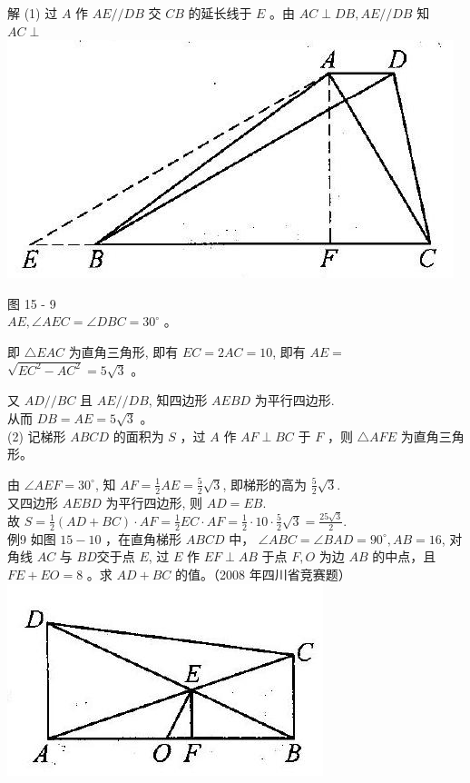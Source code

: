 \documentclass[10pt]{article}
\begin{document}
解 (1) 过 $A$ 作 $A E / / D B$ 交 $C B$ 的延长线于 $E$ 。由 $A C \perp D B, A E / / D B$ 知 $A C \perp$\\
\includegraphics[max width=\textwidth, center]{2024_10_30_2c8f45efd4a519b08e1ag-141(2)}

图 15 - 9\\
$A E, \angle A E C=\angle D B C=30^{\circ}$ 。

即 $\triangle E A C$ 为直角三角形, 即有 $E C=2 A C=10$, 即有 $A E=$ $\sqrt{E C^{2}-A C^{2}}=5 \sqrt{3}$ 。

又 $A D / / B C$ 且 $A E / / D B$, 知四边形 $A E B D$ 为平行四边形.\\
从而 $D B=A E=5 \sqrt{3}$ 。\\
(2) 记梯形 $A B C D$ 的面积为 $S$ ，过 $A$ 作 $A F \perp B C$ 于 $F$ ，则 $\triangle A F E$ 为直角三角形。

由 $\angle A E F=30^{\circ}$, 知 $A F=\frac{1}{2} A E=\frac{5}{2} \sqrt{3}$, 即梯形的高为 $\frac{5}{2} \sqrt{3}$.\\
又四边形 $A E B D$ 为平行四边形, 则 $A D=E B$.\\
故 $S=\frac{1}{2}(A D+B C) \cdot A F=\frac{1}{2} E C \cdot A F=\frac{1}{2} \cdot 10 \cdot \frac{5}{2} \sqrt{3}=\frac{25 \sqrt{3}}{2}$.\\
例9 如图 $15-10$ ，在直角梯形 $A B C D$ 中， $\angle A B C=\angle B A D=90^{\circ}, A B=16$, 对角线 $A C$ 与 $B D$交于点 $E$, 过 $E$ 作 $E F \perp A B$ 于点 $F, O$ 为边 $A B$ 的中点，且 $F E+E O=8$ 。求 $A D+B C$ 的值。（2008 年四川省竞赛题）\\
\includegraphics[max width=\textwidth, center]{2024_10_30_2c8f45efd4a519b08e1ag-141(1)}
\end{document}
